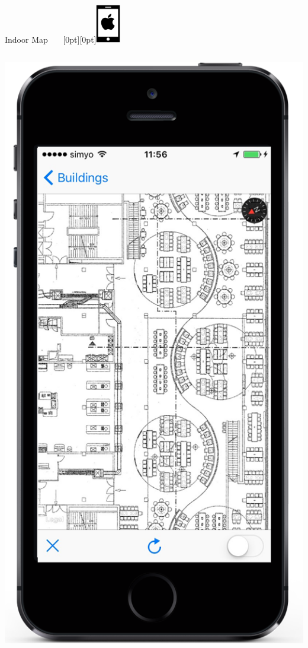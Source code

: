 \documentclass[11pt]{beamer}
\begin{document}
\begin{frame}{Indoor Map ~~~\raisebox{-10pt}[0pt][0pt]{\includegraphics[width=0.08\textwidth]{tech-stack-apple}}}
\begin{columns}[T]
\begin{column}{.4\textwidth}
  \includegraphics[scale=0.25]{mapisready}
  \end{column}
\end{columns}

\end{frame}
\end{document}
